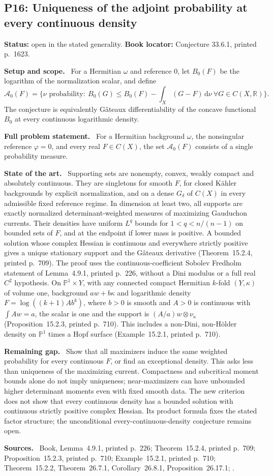 \documentclass[11pt]{article}
\newcommand{\field}[1]{\par\medskip\noindent\textbf{#1.}\ }
\begin{document}
\subsection{P16: Uniqueness of the adjoint probability at every continuous density}
\label{P16}
\noindent\textbf{Status:} open in the stated generality. \textbf{Book locator:} Conjecture 33.6.1, printed p.~1623.
\field{Setup and scope} For a Hermitian $\omega$ and reference $0$, let $B_0(F)$ be the logarithm of the normalization scalar, and define
\[\mathcal A_0(F)=\{\nu\text{ probability}:\ B_0(G)\leq B_0(F)-\int_X(G-F)\,\mathrm d\nu\ \forall G\in C(X,\mathbb R)\}.\]
The conjecture is equivalently G\^ateaux differentiability of the concave functional $B_0$ at every continuous logarithmic density.
\field{Full problem statement} For a Hermitian background $\omega$, the nonsingular reference $\varphi=0$, and every real $F\in C(X)$, the set $\mathcal A_0(F)$ consists of a single probability measure.
\field{State of the art} Supporting sets are nonempty, convex, weakly compact and absolutely continuous. They are singletons for smooth $F$, for closed K\"ahler backgrounds by explicit normalization, and on a dense $G_\delta$ of $C(X)$ in every admissible fixed reference regime. In dimension at least two, all supports are exactly normalized determinant-weighted measures of maximizing Gauduchon currents. Their densities have uniform $L^q$ bounds for $1<q<n/(n-1)$ on bounded sets of $F$, and at the endpoint if lower mass is positive. A bounded solution whose complex Hessian is continuous and everywhere strictly positive gives a unique stationary support and the G\^ateaux derivative (Theorem~15.2.4, printed p.~709). The proof uses the continuous-coefficient Sobolev Fredholm statement of Lemma~4.9.1, printed p.~226, without a Dini modulus or a full real $C^2$ hypothesis. On $\mathbb P^1\times Y$, with any connected compact Hermitian $k$-fold $(Y,\kappa)$ of volume one, background $aw+b\kappa$ and logarithmic density $F=\log((k+1)Ab^k)$, where $b>0$ is smooth and $A>0$ is continuous with $\int Aw=a$, the scalar is one and the support is $(A/a)w\otimes\nu_\kappa$ (Proposition~15.2.3, printed p.~710). This includes a non-Dini, non-H\"older density on $\mathbb P^1$ times a Hopf surface (Example~15.2.1, printed p.~710).
\field{Remaining gap} Show that all maximizers induce the same weighted probability for every continuous $F$, or find an exceptional density. This asks less than uniqueness of the maximizing current. Compactness and subcritical moment bounds alone do not imply uniqueness; near-maximizers can have unbounded higher determinant moments even with fixed smooth data. The new criterion does not show that every continuous density has a bounded solution with continuous strictly positive complex Hessian. Its product formula fixes the stated factor structure; the unconditional every-continuous-density conjecture remains open.
\field{Sources} Book, Lemma~4.9.1, printed p.~226; Theorem~15.2.4, printed p.~709; Proposition~15.2.3, printed p.~710; Example~15.2.1, printed p.~710; Theorem~15.2.2, Theorem~26.7.1, Corollary~26.8.1, Proposition~26.17.1; \cite{TW10}.
\end{document}
